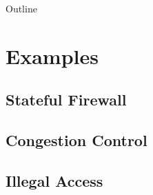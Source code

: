 \documentclass{beamer}
\begin{document}
\begin{frame}
    \titlepage
\end{frame}

\begin{frame}{Outline}
    \tableofcontents
\end{frame}


\section{Examples}

\subsection{Stateful Firewall}



\subsection{Congestion Control}



\subsection{Illegal Access}


\end{document}
